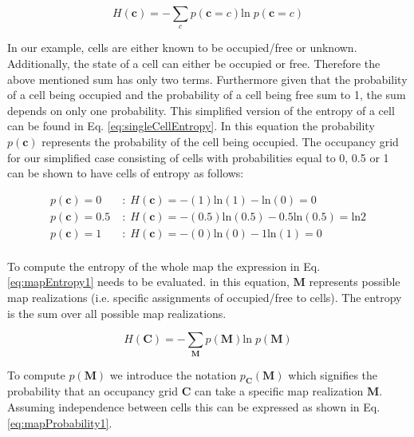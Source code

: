 \documentclass[a4paper,12pt]{article}
\begin{document}
			\begin{equation}
				H \left(\textbf{c}\right) = - \sum_{c} p\left(\textbf{c}=c\right)\text{ln} \; p\left(\textbf{c}=c\right)
				\label{eq:singleCellEntropy1}
			\end{equation}
			
			In our example, cells are either known to be occupied/free or unknown. Additionally, the state of a cell can either be occupied or free. Therefore the above mentioned sum has only two terms. Furthermore given that the probability of a cell being occupied and the probability of a cell being free sum to 1, the sum depends on only one probability. This simplified version of the entropy of a cell can be found in Eq. \ref{eq:singleCellEntropy}. In this equation the probability $p\left(\textbf{c}\right)$ represents the probability of the cell being occupied. The occupancy grid for our simplified case consisting of cells with probabilities equal to 0, 0.5 or 1 can be shown to have cells of entropy as follows:

			\begin{align}
				\nonumber p\left(\textbf{c}\right) = 0 \; &: \; H \left(\textbf{c}\right) = -(1)\text{ln}(1)-\text{ln}(0) = 0 \\
				\nonumber p\left(\textbf{c}\right) = 0.5 \; &: \; H \left(\textbf{c}\right) = -(0.5)\text{ln}(0.5)-0.5\text{ln}(0.5) = \text{ln}2 \\
				\nonumber p\left(\textbf{c}\right) = 1 \; &: \; H \left(\textbf{c}\right) = -(0)\text{ln}(0)-1\text{ln}(1) = 0 \\
			\end{align}

			To compute the entropy of the whole map the expression in Eq. \ref{eq:mapEntropy1} needs to be evaluated. in this equation, $\textbf{M}$ represents possible map realizations (i.e. specific assignments of occupied/free to cells). The entropy is the sum over all possible map realizations.

			\begin{equation}
				H \left(\textbf{C}\right) = - \sum_{\textbf{M}} p\left(\textbf{M}\right) \text{ln} \; p\left(\textbf{M}\right)
				\label{eq:mapEntropy1}
			\end{equation}
			
			To compute $p(\textbf{M})$ we introduce the notation $p_\textbf{C}(\textbf{M})$ which signifies the probability that an occupancy grid $\textbf{C}$ can take a specific map realization $\textbf{M}$. Assuming independence between cells this can be expressed as shown in Eq. \ref{eq:mapProbability1}.
			
\end{document}
